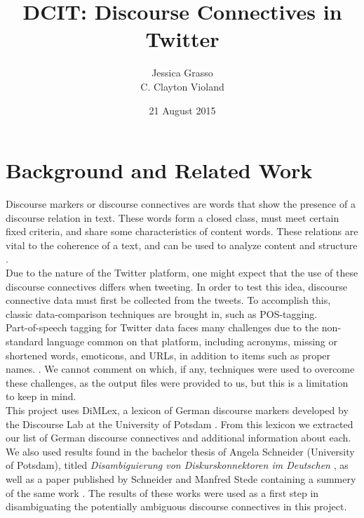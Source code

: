\documentclass[11pt]{article}
\title{\textbf{DCIT: Discourse Connectives in Twitter}}
\author{Jessica Grasso \mono{jgrasso@uni-potsdam.de}
\\C. Clayton Violand  \mono{charles.violand@uni-potsdam.de}}
\date{21 August 2015}
\begin{document}
\maketitle


\section{Background and Related Work}

Discourse markers or discourse connectives are words that show the presence of a discourse relation in text.  These words form a closed class, must meet certain fixed criteria, and share some characteristics of content words.  These relations are vital to the coherence of a text, and can be used to analyze content and structure \cite{dimlex}. \\

Due to the nature of the Twitter platform, one might expect that the use of these discourse connectives differs when tweeting. In order to test this idea, discourse connective data must first be collected from the tweets. To accomplish this, classic data-comparison techniques are brought in, such as POS-tagging.\\

Part-of-speech tagging for Twitter data faces many challenges due to the non-standard language common on that platform, including acronyms, missing or shortened words, emoticons, and URLs, in addition to items such as proper names. \cite{GermanTweetTagging}.  We cannot comment on which, if any, techniques were used to overcome these challenges, as the output files were provided to us, but this is a limitation to keep in mind.\\

This project uses DiMLex, a lexicon of German discourse markers developed by the Discourse Lab at the University of Potsdam \cite{dimlex}.  From this lexicon we extracted our list of German discourse connectives and additional information about each.\\

We also used results found in the bachelor thesis of Angela Schneider (University of Potsdam), titled \emph{Disambiguierung von Diskurskonnektoren im Deutschen} \cite{schneider1}, as well as a paper published by Schneider and Manfred Stede containing a summery of the same work \cite{schneider2}.  The results of these works were used as a first step in disambiguating the potentially ambiguous discourse connectives in this project.
\end{document}
